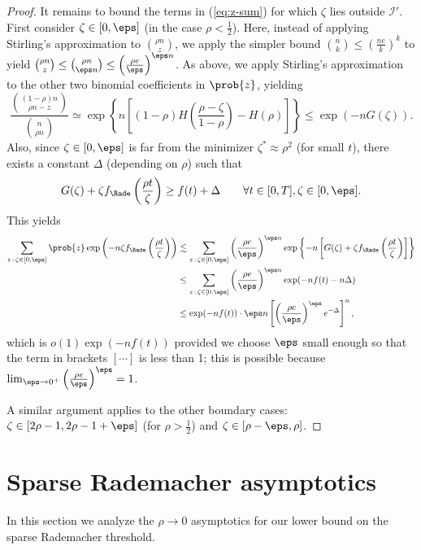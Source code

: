 \documentclass{article}
\begin{document}
\begin{proof}
It remains to bound the terms in (\ref{eq:z-sum}) for which $\zeta$ lies outside $\mathcal{I}'$. First consider $\zeta \in [0,\eps]$ (in the case $\rho < \frac{1}{2}$). Here, instead of applying Stirling's approximation to $\binom{\rho n}{z}$, we apply the simpler bound $\binom{n}{k} \le \left(\frac{ne}{k}\right)^k$ to yield $\binom{\rho n}{z} \le \binom{\rho n}{\eps n} \le \left(\frac{\rho e}{\eps}\right)^{\eps n}$. As above, we apply Stirling's approximation to the other two binomial coefficients in $\prob{z}$, yielding
$$\frac{\binom{(1-\rho)n}{\rho n-z}}{\binom{n}{\rho n}} \simeq \exp\left\{n\left[(1-\rho)H\left(\frac{\rho-\zeta}{1-\rho}\right) - H(\rho)\right]\right\} \le \exp(-nG(\zeta)).$$
Also, since $\zeta \in [0,\eps]$ is far from the minimizer $\zeta^* \approx \rho^2$ (for small $t$), there exists a constant $\Delta$ (depending on $\rho$) such that
$$G(\zeta) + \zeta f_\Rade\left(\frac{\rho t}{\zeta}\right) \ge f(t) + \Delta \qquad \forall t \in [0,T], \zeta \in [0,\eps].$$
This yields
\begin{align*}
\sum_{z \, :\, \zeta \in [0,\eps]} \prob{z} \exp\left(-n \zeta f_\Rade\left(\frac{\rho t}{\zeta}\right)\right)
&\lesssim \sum_{z \, :\, \zeta \in [0,\eps]} \left(\frac{\rho e}{\eps}\right)^{\eps n} \exp\left\{-n\left[G(\zeta) + \zeta f_\Rade\left(\frac{\rho t}{\zeta}\right)\right]\right\} \\
&\le \sum_{z \, :\, \zeta \in [0,\eps]} \left(\frac{\rho e}{\eps}\right)^{\eps n} \exp(-nf(t) - n \Delta) \\
&\le \exp(-nf(t)) \cdot \eps n \left[\left(\frac{\rho e}{\eps}\right)^\eps e^{-\Delta} \right]^n,
\end{align*}
which is $o(1) \exp(-nf(t))$ provided we choose $\eps$ small enough so that the term in brackets $[\cdots]$ is less than 1; this is possible because $\lim_{\eps \to 0^+} \left(\frac{\rho e}{\eps}\right)^\eps = 1$.

A similar argument applies to the other boundary cases: $\zeta \in [2\rho-1,2\rho-1 + \eps]$ (for $\rho > \frac{1}{2}$) and $\zeta \in [\rho - \eps, \rho]$.
\end{proof}





\section{Sparse Rademacher asymptotics}
\label{app:sparse-rad-p0}

In this section we analyze the $\rho \to 0$ asymptotics for our lower bound on the sparse Rademacher threshold.
\end{document}
